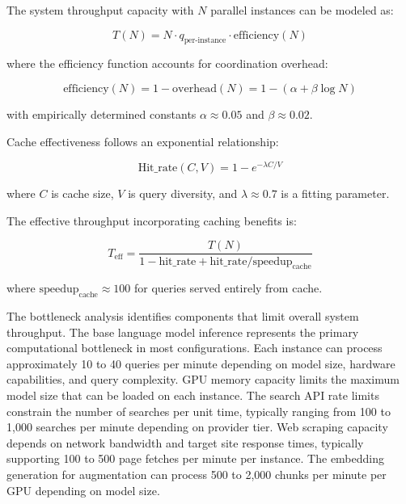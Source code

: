 The system throughput capacity with $N$ parallel instances can be modeled as:

\begin{equation}
T(N) = N \cdot q_{\text{per-instance}} \cdot \text{efficiency}(N)
\label{eq:throughput}
\end{equation}

where the efficiency function accounts for coordination overhead:

\begin{equation}
\text{efficiency}(N) = 1 - \text{overhead}(N) = 1 - (\alpha + \beta \log N)
\label{eq:efficiency}
\end{equation}

with empirically determined constants $\alpha \approx 0.05$ and $\beta \approx 0.02$.

Cache effectiveness follows an exponential relationship:

\begin{equation}
\text{Hit\_rate}(C, V) = 1 - e^{-\lambda C/V}
\label{eq:cache_hit_rate}
\end{equation}

where $C$ is cache size, $V$ is query diversity, and $\lambda \approx 0.7$ is a fitting parameter.

The effective throughput incorporating caching benefits is:

\begin{equation}
T_{\text{eff}} = \frac{T(N)}{1 - \text{hit\_rate} + \text{hit\_rate}/\text{speedup}_{\text{cache}}}
\label{eq:effective_throughput}
\end{equation}

where $\text{speedup}_{\text{cache}} \approx 100$ for queries served entirely from cache.

The bottleneck analysis identifies components that limit overall system throughput. The base language model inference represents the primary computational bottleneck in most configurations. Each instance can process approximately 10 to 40 queries per minute depending on model size, hardware capabilities, and query complexity. GPU memory capacity limits the maximum model size that can be loaded on each instance. The search API rate limits constrain the number of searches per unit time, typically ranging from 100 to 1,000 searches per minute depending on provider tier. Web scraping capacity depends on network bandwidth and target site response times, typically supporting 100 to 500 page fetches per minute per instance. The embedding generation for augmentation can process 500 to 2,000 chunks per minute per GPU depending on model size.

